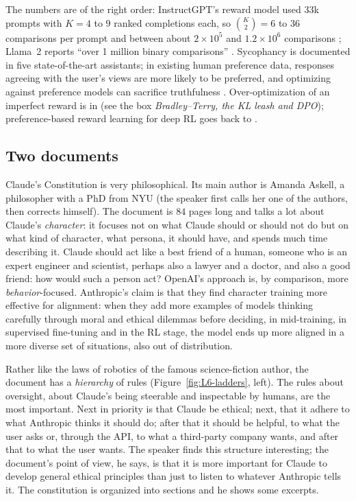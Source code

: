 \begin{beyond}\label{box:L6-sycophancy}
The numbers are of the right order: InstructGPT's reward model used $33$k prompts with $K=4$ to $9$ ranked completions each, so $\binom K2=6$ to $36$ comparisons per prompt and between about $2\times10^5$ and $1.2\times10^6$ comparisons \citep{ouyang2022}; Llama~2 reports ``over 1 million binary comparisons'' \citep{touvron2023}. Sycophancy is documented in five state-of-the-art assistants; in existing human preference data, responses agreeing with the user's views are more likely to be preferred, and optimizing against preference models can sacrifice truthfulness \citep{sharma2023}. Over-optimization of an imperfect reward is in \citet{gao2023} (see the box \emph{Bradley--Terry, the KL leash and DPO}); preference-based reward learning for deep RL goes back to \citet{christiano2017}.
\end{beyond}

\subsection{Two documents}\label{sec:L6-docs}
Claude's Constitution is very philosophical. Its main author is Amanda Askell, a philosopher with a PhD from NYU (the speaker first calls her one of the authors, then corrects himself). The document is $84$ pages long and talks a lot about Claude's \emph{character}: it focuses not on what Claude should or should not do but on what kind of character, what persona, it should have, and spends much time describing it. Claude should act like a best friend of a human, someone who is an expert engineer and scientist, perhaps also a lawyer and a doctor, and also a good friend: how would such a person act? OpenAI's approach is, by comparison, more \emph{behavior}-focused. Anthropic's claim is that they find character training more effective for alignment: when they add more examples of models thinking carefully through moral and ethical dilemmas before deciding, in mid-training, in supervised fine-tuning and in the RL stage, the model ends up more aligned in a more diverse set of situations, also out of distribution.

Rather like the laws of robotics of the famous science-fiction author, the document has a \emph{hierarchy} of rules (Figure~\ref{fig:L6-ladders}, left). The rules about oversight, about Claude's being steerable and inspectable by humans, are the most important. Next in priority is that Claude be ethical; next, that it adhere to what Anthropic thinks it should do; after that it should be helpful, to what the user asks or, through the API, to what a third-party company wants, and after that to what the user wants. The speaker finds this structure interesting; the document's point of view, he says, is that it is more important for Claude to develop general ethical principles than just to listen to whatever Anthropic tells it. The constitution is organized into sections and he shows some excerpts.

